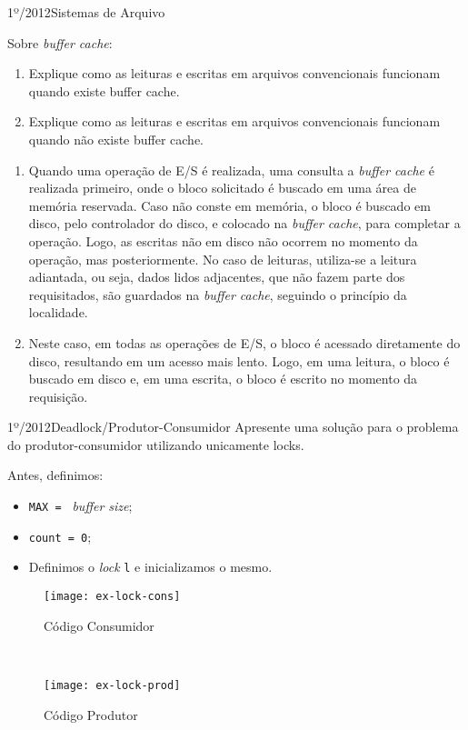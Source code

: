 \begin{exercicio}
  {1º/2012}{Sistemas de Arquivo}
  {Sobre \textit{buffer cache}:
  \begin{enumerate}[label=(\alph*)]
    \item Explique como as leituras e escritas em arquivos convencionais funcionam quando existe buffer cache.
    \item Explique como as leituras e escritas em arquivos convencionais funcionam quando não existe buffer cache.
  \end{enumerate}}

  \begin{enumerate}[label=(\alph*)]
    \item Quando uma operação de E/S é realizada, uma consulta a \textit{buffer cache} é realizada primeiro, onde o bloco solicitado é buscado em uma área de memória reservada. Caso não conste em memória, o bloco é buscado em disco, pelo controlador do disco, e colocado na \textit{buffer cache}, para completar a operação. Logo, as escritas não em disco não ocorrem no momento da operação, mas posteriormente. No caso de leituras, utiliza-se a leitura adiantada, ou seja, dados lidos adjacentes, que não fazem parte dos requisitados, são guardados na \textit{buffer cache}, seguindo o princípio da localidade.

    \item Neste caso, em todas as operações de E/S, o bloco é acessado diretamente do disco, resultando em um acesso mais lento. Logo, em uma leitura, o bloco é buscado em disco e, em uma escrita, o bloco é escrito no momento da requisição.
  \end{enumerate}
\end{exercicio}

\begin{exercicio}
  {1º/2012}{Deadlock/Produtor-Consumidor}
  {Apresente uma solução para o problema do produtor-consumidor utilizando unicamente locks.}
  \label{ex:prod-cons-locks}

  Antes, definimos:
  \begin{itemize}
    \item \texttt{MAX = } \textit{buffer size};
    \item \texttt{count = 0};
    \item Definimos o \textit{lock} \texttt{l} e inicializamos o mesmo.
  \end{itemize}

  \begin{figure*}[h]
    \begin{subfigure}{.45\textwidth}
      \texttt{[image: ex-lock-cons]}
      \caption{Código Consumidor}
    \end{subfigure}
    ~
    \begin{subfigure}{.45\textwidth}
      \texttt{[image: ex-lock-prod]}
      \caption{Código Produtor}
    \end{subfigure}
  \end{figure*}
\end{exercicio}


